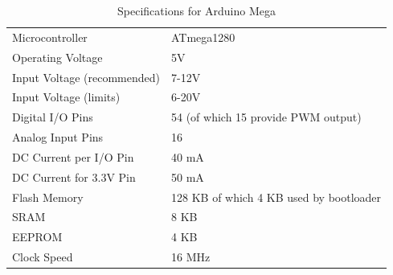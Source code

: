 \begin{table}[h!]
\begin{tabular}{| l | l |}
\hline
Microcontroller & ATmega1280\\
Operating Voltage & 5V\\
Input Voltage (recommended) & 7-12V\\
Input Voltage (limits) & 6-20V\\
Digital I/O Pins & 54 (of which 15 provide PWM output)\\
Analog Input Pins & 16\\
DC Current per I/O Pin & 40 mA\\
DC Current for 3.3V Pin & 50 mA\\
Flash Memory & 128 KB of which 4 KB used by bootloader\\
SRAM & 8 KB\\
EEPROM & 4 KB\\
Clock Speed & 16 MHz\\
\hline
\end{tabular}
\caption{Specifications for Arduino Mega}
\end{table}
\label{tab:megaspec}
